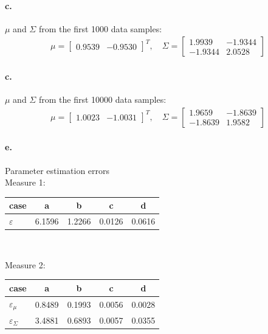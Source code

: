 \documentclass[a4paper]{article}
\begin{document}
\paragraph{c.} $\mu$ and $\Sigma$ from the first 1000 data samples: \\
\begin{align*}
	\mu = \begin{bmatrix}
		0.9539 & -0.9530
	\end{bmatrix}^{T}, \quad
	\Sigma = \begin{bmatrix}
		 1.9939  & -1.9344 \\
		-1.9344  &  2.0528
	\end{bmatrix}
\end{align*}

\paragraph{c.} $\mu$ and $\Sigma$ from the first 10000 data samples: \\
\begin{align*}
	\mu = \begin{bmatrix}
		1.0023 & -1.0031
	\end{bmatrix}^{T}, \quad
	\Sigma = \begin{bmatrix}
		 1.9659  & -1.8639 \\
		-1.8639  &  1.9582
	\end{bmatrix}
\end{align*}

\paragraph{e.} Parameter estimation errors \\

Measure 1:
	\begin{tabular}{l *{4}{c}}
			case      &   a    &   b    &   c    &   d    \\ \hline
		$\varepsilon$ & 6.1596 & 1.2266 & 0.0126 & 0.0616
	\end{tabular} \\
\vspace{2em}
 
Measure 2: 
	\begin{tabular}{l *{4}{c}}
				case            &   a    &   b    &   c    &   d    \\ \hline
		$\varepsilon _{\mu}$    & 0.8489 & 0.1993 & 0.0056 & 0.0028 \\ 
		$\varepsilon _{\Sigma}$ & 3.4881 & 0.6893 & 0.0057 & 0.0355 
	\end{tabular} \\
\vspace{2em}
\end{document}
